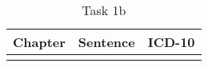 \begin{table}[htbp] \footnotesize \center
\caption{Task 1b\label{tab:task1b}}
\begin{tabular}{c c l}
    \toprule
    Chapter & Sentence & ICD-10 \\
    \midrule
	\addlinespace
	\addlinespace
	\addlinespace
	\addlinespace
	\addlinespace
	\addlinespace
	\addlinespace
	\bottomrule
\end{tabular}
\end{table}


